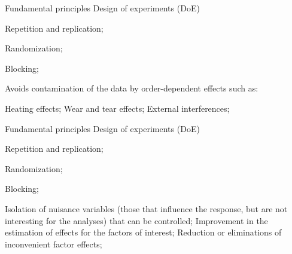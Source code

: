 \documentclass[t]{beamer}
\begin{document}

\begin{ftst}
{Fundamental principles}
{Design of experiments (DoE)}
\begin{block}{}
	\bitems Repetition and replication;
		\item \alert{Randomization};
		\item Blocking;
	\eitem
\end{block}
\bitems Avoids contamination of the data by order-dependent effects such as:

	\bitems Heating effects;
		\spitem Wear and tear effects;
		\spitem External interferences;
	\eitem
\eitem
\end{ftst}


\begin{ftst}
{Fundamental principles}
{Design of experiments (DoE)}
\begin{block}{}
	\bitems Repetition and replication;
		\item Randomization;
		\item \alert{Blocking};
	\eitem
\end{block}
\bitems Isolation of nuisance variables (those that influence the response, but are not interesting for the analyses) that can be controlled;
	\spitem Improvement in the estimation of effects for the factors of interest;
	\spitem Reduction or eliminations of inconvenient factor effects;
\eitem
\end{ftst}

\end{document}
